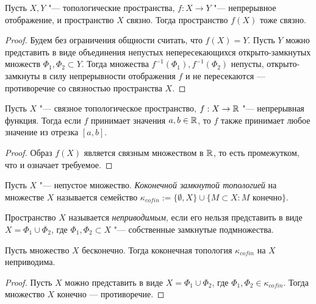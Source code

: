 \begin{theorem}\label{theoremmain}
	Пусть $X, Y$ "--- топологические пространства, $f : X \to Y$ "--- непрерывное отображение, и пространство $X$ связно. Тогда пространство $f(X)$ тоже связно.
\end{theorem}

\begin{proof}
	Будем без ограничения общности считать, что $f(X) = Y$. Пусть $Y$ можно представить в виде объединения непустых непересекающихся открыто-замкнутых множеств $\Phi_1, \Phi_2 \subset Y$. Тогда множества $f^{-1}(\Phi_1), f^{-1}(\Phi_2)$ непусты, открыто-замкнуты в силу непрерывности отображения $f$ и не пересекаются --- противоречие со связностью пространства $X$.
\end{proof}

\begin{corollary}
	Пусть $X$ "--- связное топологическое пространство, $f : X \to \mathbb{R}$ "--- непрерывная функция. Тогда если $f$ принимает значения $a, b \in \mathbb{R}$, то $f$ также принимает любое значение из отрезка $[a, b]$.
\end{corollary}

\begin{proof}
	Образ $f(X)$ является связным множеством в $\mathbb{R}$, то есть промежутком, что и означает требуемое.
\end{proof}

\begin{definition}
	Пусть $X$ "--- непустое множество. \textit{Коконечной замкнутой топологией} на множестве $X$ называется семейство $\kappa_{cofin} := \{\emptyset, X\} \cup \{M \subset X : M \text{ конечно}\}$.
\end{definition}

\begin{definition}
	Пространство $X$ называется \textit{неприводимым}, если его нельзя представить в виде $X = \Phi_1 \cup \Phi_2$, где $\Phi_1, \Phi_2 \subset X$ "--- собственные замкнутые подмножества.
\end{definition}

\begin{theorem}
	Пусть множество $X$ бесконечно. Тогда коконечная топология $\kappa_{cofin}$ на $X$ неприводима.
\end{theorem}

\begin{proof}
	Пусть $X$ можно представить в виде $X = \Phi_1 \cup \Phi_2$, где $\Phi_1, \Phi_2 \in \kappa_{cofin}$. Тогда множество $X$ конечно --- противоречие.
\end{proof}

